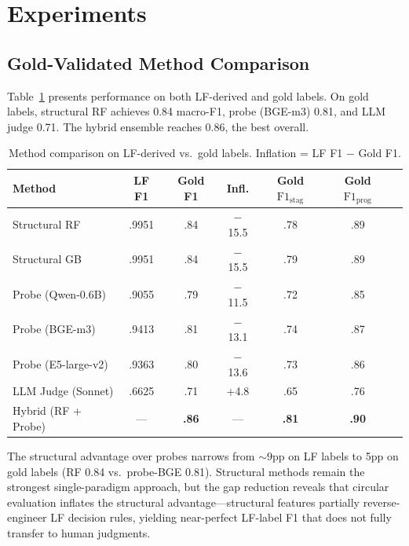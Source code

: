 \documentclass[11pt]{article}
\begin{document}
\section{Experiments}
\label{sec:experiments}

\subsection{Gold-Validated Method Comparison}
\label{sec:gold_comparison}

Table~\ref{tab:gold_comparison} presents performance on both LF-derived and gold labels.
On gold labels, structural RF achieves 0.84 macro-F1, probe (BGE-m3) 0.81, and LLM judge 0.71.
The hybrid ensemble reaches 0.86, the best overall.

\begin{table}[t]
\centering
\caption{Method comparison on LF-derived vs.\ gold labels. Inflation = LF F1 $-$ Gold F1.}
\label{tab:gold_comparison}
\small
\begin{tabular}{lcccccc}
\toprule
\textbf{Method} & \textbf{LF F1} & \textbf{Gold F1} & \textbf{Infl.} & \textbf{Gold $\text{F1}_\text{stag}$} & \textbf{Gold $\text{F1}_\text{prog}$} \\
\midrule
Structural RF       & .9951 & .84 & $-$15.5 & .78 & .89 \\
Structural GB       & .9951 & .84 & $-$15.5 & .79 & .89 \\
Probe (Qwen-0.6B)   & .9055 & .79 & $-$11.5 & .72 & .85 \\
Probe (BGE-m3)       & .9413 & .81 & $-$13.1 & .74 & .87 \\
Probe (E5-large-v2)  & .9363 & .80 & $-$13.6 & .73 & .86 \\
LLM Judge (Sonnet)   & .6625 & .71 & +4.8    & .65 & .76 \\
\midrule
Hybrid (RF + Probe)  & ---   & \textbf{.86} & ---  & \textbf{.81} & \textbf{.90} \\
\bottomrule
\end{tabular}
\end{table}

The structural advantage over probes narrows from ${\sim}9$pp on LF labels to 5pp on gold labels (RF 0.84 vs.\ probe-BGE 0.81).
Structural methods remain the strongest single-paradigm approach, but the gap reduction reveals that circular evaluation inflates the structural advantage---structural features partially reverse-engineer LF decision rules, yielding near-perfect LF-label F1 that does not fully transfer to human judgments.
\end{document}
